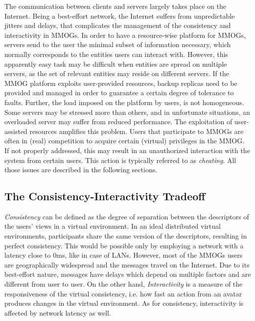 \documentclass[final,10pt,a5paper]{phdimt}
\theoremstyle{definition}
\begin{document}
The communication between clients and servers largely takes place on the Internet. Being a best-effort network, the Internet suffers from unpredictable jitters and delays, that complicates the management of the consistency and interactivity in MMOGs.
In order to have a resource-wise platform for MMOGs, servers send to the user the minimal subset of information necessary, which normally corresponds to the entities users can interact with. However, this apparently easy task may be difficult when entities are spread on multiple servers, as the set of relevant entities may reside on different servers.
If the MMOG platform exploits user-provided resources, backup replicas need to be provided and managed in order to guarantee a certain degree of tolerance to faults.
Further, the load imposed on the platform by users, is not homogeneous. Some servers may be stressed more than others, and in unfortunate situations, an overloaded server may suffer from reduced performance. The exploitation of user-assisted resources amplifies this problem.
Users that participate to MMOGs are often in (real) competition to acquire certain (virtual) privileges in the MMOG. If not properly addressed, this may result in an unauthorized interaction with the system from certain users. This action is typically referred to as \textit{cheating}.
All those issues are described in the following sections.




\subsection{The Consistency-Interactivity Tradeoff}


\textit{Consistency} can be defined as the degree of separation between the descriptors of the users' views in a virtual environment.
In an ideal distributed virtual environments, participants share the same version of the descriptors, resulting in perfect consistency.
This would be possible only by employing a network with a latency close to 0ms, like in case of LANs.
However, most of the MMOGs users are geographically widespread and the messages travel on the Internet.
Due to its best-effort nature, messages have delays which depend on multiple factors and are different from user to user.
On the other hand, \textit{Interactivity} is a measure of the responsiveness of the virtual consistency, i.e. how fast an action from an avatar produces changes in the virtual environment. As for consistency, interactivity is affected by network latency as well. 
\end{document}
